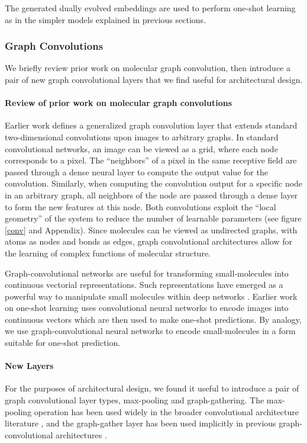 The generated dually evolved embeddings are used to perform one-shot learning as in the simpler models explained in previous sections.

\subsubsection{Graph Convolutions}
We briefly review prior work on molecular graph convolution, then introduce a pair of new graph convolutional layers that we find useful for architectural design.

\paragraph{Review of prior work on molecular graph convolutions}
Earlier work \cite{duvenaud2015convolutional} defines a generalized graph convolution layer that extends standard two-dimensional convolutions upon images to arbitrary graphs. In standard convolutional networks, an image can be viewed as a grid, where each node corresponds to a pixel. The ``neighbors'' of a pixel in the same receptive field are passed through a dense neural layer to compute the output value for the convolution\cite{karpathy231n}. Similarly, when computing the convolution output for a specific node in an arbitrary graph, all neighbors of the node are passed through a dense layer to form the new features at this node. Both convolutions exploit the ``local geometry'' of the system to reduce the number of learnable parameters (see figure \ref{conv} and Appendix). Since molecules can be viewed as undirected graphs, with atoms as nodes and bonds as edges, graph convolutional architectures allow for the learning of complex functions of molecular structure.

Graph-convolutional networks are useful for transforming small-molecules into continuous vectorial representations. Such representations have emerged as a powerful way to manipulate small molecules within deep networks \cite{gomez2016automatic}. Earlier work on one-shot learning uses convolutional neural networks to encode images into continuous vectors which are then used to make one-shot predictions. By analogy, we use graph-convolutional neural networks to encode small-molecules in a form suitable for one-shot prediction.


\paragraph{New Layers}
For the purposes of architectural design, we found it useful to introduce a pair of graph convolutional layer types, max-pooling and graph-gathering. The max-pooling operation has been used widely in the broader convolutional architecture literature \cite{karpathy231n}, and the graph-gather layer has been used implicitly in previous graph-convolutional architectures \cite{duvenaud2015convolutional}.

